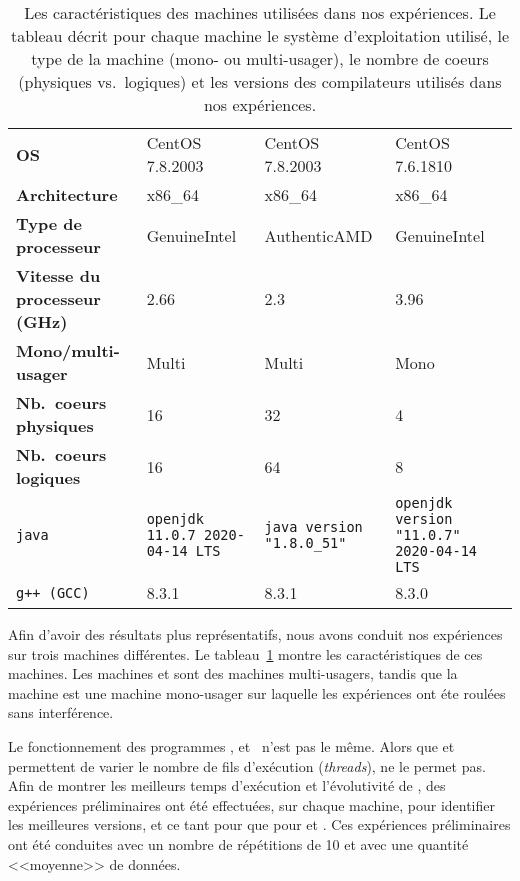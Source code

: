 

\newcommand{\LARGEUR}{3cm}

\begin{table}
\begin{tabular}{|p{3cm}|p{\LARGEUR}|p{\LARGEUR}|p{\LARGEUR}|}
\hline
  & \M1 & \M2 & \M3
\\\hline
\textbf{OS} & CentOS 7.8.2003 & CentOS 7.8.2003 & CentOS 7.6.1810
\\\hline
\textbf{Architecture} &  x86\_64 & x86\_64 & x86\_64
\\\hline
\textbf{Type de processeur} & GenuineIntel  & AuthenticAMD & GenuineIntel
\\\hline
\textbf{Vitesse du processeur (GHz)} & 2.66 & 2.3 & 3.96
\\\hline
\textbf{Mono/multi-usager} & Multi & Multi & Mono
\\\hline
\textbf{Nb.~coeurs physiques} & 16 & 32 & 4
\\\hline
\textbf{Nb.~coeurs logiques} & 16 & 64 & 8
\\\hline
\texttt{java}
  & \texttt{openjdk 11.0.7 2020-04-14 LTS}
  & \texttt{java version "1.8.0\_51"}
  & \texttt{openjdk version "11.0.7" 2020-04-14 LTS}
\\\hline
\texttt{g++ (GCC)}
   & 8.3.1
   & 8.3.1 
   & 8.3.0
\\\hline
\end{tabular}
\caption[Les caract\'eristiques des machines utilis\'ees dans nos exp\'eriences.]{Les caract\'eristiques des machines utilis\'ees dans nos exp\'eriences. Le tableau d\'ecrit pour chaque machine le syst\`eme d'exploitation utilis\'e, le type de la machine (mono- ou multi-usager), le nombre de coeurs (physiques vs.\ logiques) et les versions des compilateurs utilis\'es dans nos exp\'eriences.}
\label{machines.table}
\end{table}


Afin d'avoir des r\'esultats plus représentatifs, nous avons conduit nos exp\'eriences sur trois machines diff\'erentes. Le tableau~\ref{machines.table} montre les caract\'eristiques de ces machines. Les machines  et  sont des machines multi-usagers, tandis que la machine  est une machine mono-usager sur laquelle les exp\'eriences ont \'et\/e roul\'ees sans interf\'erence.

Le fonctionnement des programmes ,  et~ n'est pas le m\^eme. Alors que  et  permettent de varier le nombre de fils d'ex\'ecution (\emph{threads}),  ne le permet pas. Afin de montrer les meilleurs temps d'ex\'ecution et l'\'evolutivit\'e de , des exp\'eriences pr\'eliminaires ont \'et\'e effectu\'ees, sur chaque machine, pour identifier les meilleures versions, et ce tant pour  que pour  et .
Ces exp\'eriences pr\'eliminaires ont \'et\'e conduites avec un nombre de r\'ep\'etitions de 10 et avec une quantit\'e <<moyenne>> de donn\'ees. 

